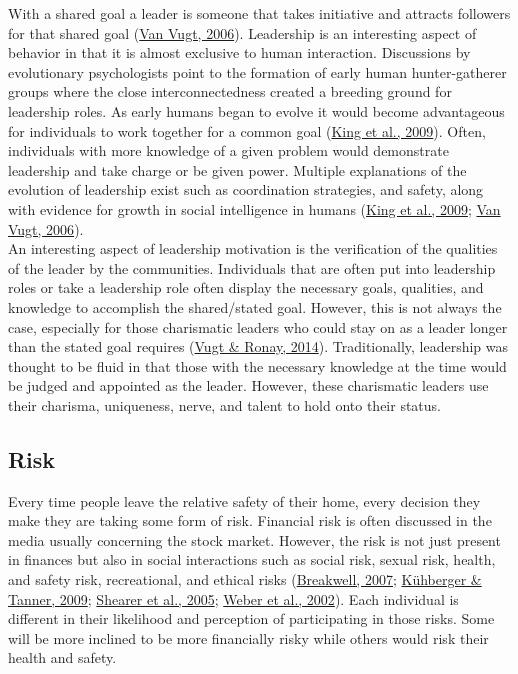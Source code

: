 \documentclass[
  donotrepeattitle,doc, 12pt, a4paper,floatsintext]{apa7}
\begin{document}
With a shared goal a leader is someone that takes initiative and attracts followers for that shared goal (\protect\hyperlink{ref-vanvugt2006}{Van Vugt, 2006}). Leadership is an interesting aspect of behavior in that it is almost exclusive to human interaction. Discussions by evolutionary psychologists point to the formation of early human hunter-gatherer groups where the close interconnectedness created a breeding ground for leadership roles. As early humans began to evolve it would become advantageous for individuals to work together for a common goal (\protect\hyperlink{ref-king2009}{King et al., 2009}). Often, individuals with more knowledge of a given problem would demonstrate leadership and take charge or be given power. Multiple explanations of the evolution of leadership exist such as coordination strategies, and safety, along with evidence for growth in social intelligence in humans (\protect\hyperlink{ref-king2009}{King et al., 2009}; \protect\hyperlink{ref-vanvugt2006}{Van Vugt, 2006}).\\

An interesting aspect of leadership motivation is the verification of the qualities of the leader by the communities. Individuals that are often put into leadership roles or take a leadership role often display the necessary goals, qualities, and knowledge to accomplish the shared/stated goal. However, this is not always the case, especially for those charismatic leaders who could stay on as a leader longer than the stated goal requires (\protect\hyperlink{ref-vugt2014}{Vugt \& Ronay, 2014}). Traditionally, leadership was thought to be fluid in that those with the necessary knowledge at the time would be judged and appointed as the leader. However, these charismatic leaders use their charisma, uniqueness, nerve, and talent to hold onto their status.

\hypertarget{risk}{%
\subsection{Risk}\label{risk}}

Every time people leave the relative safety of their home, every decision they make they are taking some form of risk. Financial risk is often discussed in the media usually concerning the stock market. However, the risk is not just present in finances but also in social interactions such as social risk, sexual risk, health, and safety risk, recreational, and ethical risks (\protect\hyperlink{ref-breakwell2007}{Breakwell, 2007}; \protect\hyperlink{ref-kuhberger2009}{Kühberger \& Tanner, 2009}; \protect\hyperlink{ref-shearer2005}{Shearer et al., 2005}; \protect\hyperlink{ref-weber2002}{Weber et al., 2002}). Each individual is different in their likelihood and perception of participating in those risks. Some will be more inclined to be more financially risky while others would risk their health and safety.\\
\end{document}
